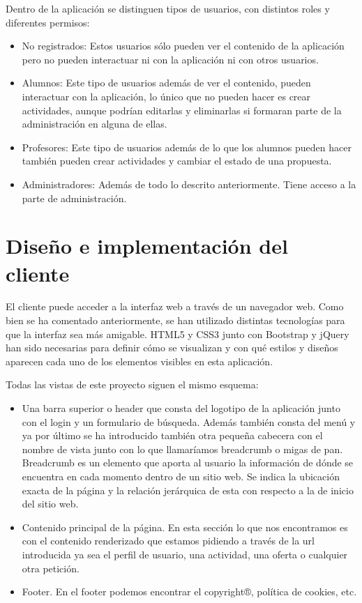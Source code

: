 Dentro de la aplicación se distinguen tipos de usuarios, con distintos roles y diferentes permisos:

\begin{itemize}
\item No registrados: Estos usuarios sólo pueden ver el contenido de la aplicación pero no pueden interactuar ni con la aplicación ni con otros usuarios.
\item Alumnos: Este tipo de usuarios además de ver el contenido, pueden interactuar con la aplicación, lo único que no pueden hacer es crear actividades, aunque podrían editarlas y eliminarlas si formaran parte de la administración en alguna de ellas.
\item Profesores: Este tipo de usuarios además de lo que los alumnos pueden hacer también pueden crear actividades y cambiar el estado de una propuesta.
\item Administradores: Además de todo lo descrito anteriormente. Tiene acceso a la parte de administración.
\end{itemize}


\section{Diseño e implementación del cliente} 
\label{sec:cliente}


El cliente puede acceder a la interfaz web a través de un navegador web. Como bien se ha comentado anteriormente, se han utilizado distintas tecnologías para que la interfaz sea más amigable. HTML5 y CSS3 junto con Bootstrap y jQuery han sido necesarias para definir cómo se visualizan y con qué estilos y diseños aparecen cada uno de los elementos visibles en esta aplicación. 


Todas las vistas de este proyecto siguen el mismo esquema:


\begin{itemize}
\item Una barra superior o header que consta del logotipo de la aplicación junto con el login y un formulario de búsqueda. Además también consta del menú y ya por último se ha introducido también otra pequeña cabecera con el nombre de vista junto con lo que llamaríamos breadcrumb o migas de pan.  Breadcrumb es un elemento que aporta al usuario la información de dónde se encuentra en cada momento dentro de un sitio web. Se indica la ubicación exacta de la página y la relación jerárquica de esta con respecto a la de inicio del sitio web.
\item Contenido principal de la página. En esta sección lo que nos encontramos es con el contenido renderizado que estamos pidiendo a través de la url introducida ya sea el perfil de usuario, una actividad, una oferta o cualquier otra petición.
\item Footer. En el footer podemos encontrar el copyright®, política de cookies, etc.
\end{itemize}


